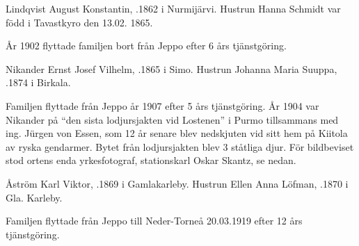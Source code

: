  Lindqvist August Konstantin, .1862 i Nurmijärvi. Hustrun Hanna Schmidt var född i Tavastkyro den 13.02. 1865.
\begin{jhchildren}
  \item {}
  \item {}
  \item {}
  \item {}
  \item {}
\end{jhchildren}
År 1902 flyttade familjen bort från Jeppo efter 6 års tjänstgöring.



 Nikander Ernst Josef Vilhelm, .1865 i Simo. Hustrun Johanna Maria Suuppa, .1874 i Birkala.
\begin{jhchildren}
  \item {}
  \item {}
  \item {}
\end{jhchildren}
Familjen flyttade från Jeppo år 1907 efter 5 års tjänstgöring. År 1904 var Nikander på ``den sista lodjursjakten vid Lostenen'' i Purmo tillsammans med ing. Jürgen von Essen, som 12 år senare blev nedskjuten vid sitt hem på Kiitola av ryska gendarmer. Bytet från lodjursjakten blev 3 ståtliga djur. För bildbeviset stod ortens enda yrkesfotograf, stationskarl Oskar Skantz, se nedan.

 Åström Karl Viktor, .1869 i Gamlakarleby. Hustrun Ellen Anna Löfman, .1870 i Gla. Karleby.
\begin{jhchildren}
  \item {}
  \item {}
  \item {}
  \item {}
\end{jhchildren}
Familjen flyttade från Jeppo till Neder-Torneå 20.03.1919 efter 12 års tjänstgöring.

